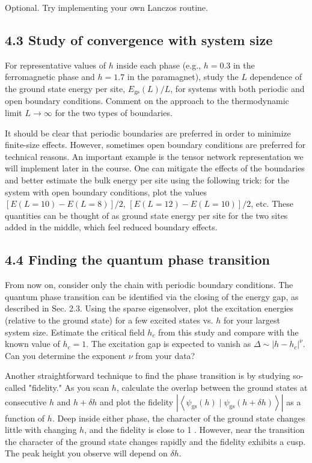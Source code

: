 \documentclass[12pt]{article}
\begin{document}
Optional. Try implementing your own Lanczos routine.

\subsection*{4.3 Study of convergence with system size}
For representative values of $h$ inside each phase (e.g., $h=0.3$ in the ferromagnetic phase and $h=1.7$ in the paramagnet), study the $L$ dependence of the ground state energy per site, $E_{\mathrm{gs}}(L) / L$, for systems with both periodic and open boundary conditions. Comment on the approach to the thermodynamic limit $L \rightarrow \infty$ for the two types of boundaries.

It should be clear that periodic boundaries are preferred in order to minimize finite-size effects. However, sometimes open boundary conditions are preferred for technical reasons. An important example is the tensor network representation we will implement later in the course. One can mitigate the effects of the boundaries and better estimate the bulk energy per site using the following trick: for the system with open boundary conditions, plot the values $[E(L=10)-E(L=8)] / 2$, $[E(L=12)-E(L=10)] / 2$, etc. These quantities can be thought of as ground state energy per site for the two sites added in the middle, which feel reduced boundary effects.

\subsection*{4.4 Finding the quantum phase transition}
From now on, consider only the chain with periodic boundary conditions. The quantum phase transition can be identified via the closing of the energy gap, as described in Sec. 2.3. Using the sparse eigensolver, plot the excitation energies (relative to the ground state) for a few excited states vs. $h$ for your largest system size. Estimate the critical field $h_{c}$ from this study and compare with the known value of $h_{c}=1$. The excitation gap is expected to vanish as $\Delta \sim\left|h-h_{c}\right|^{\nu}$. Can you determine the exponent $\nu$ from your data?

Another straightforward technique to find the phase transition is by studying so-called "fidelity." As you scan $h$, calculate the overlap between the ground states at consecutive $h$ and $h+\delta h$ and plot the fidelity $\left|\left\langle\psi_{\mathrm{gs}}(h) \mid \psi_{\mathrm{gs}}(h+\delta h)\right\rangle\right|$ as a function of $h$. Deep inside either phase, the character of the ground state changes little with changing $h$, and the fidelity is close to 1 . However, near the transition the character of the ground state changes rapidly and the fidelity exhibits a cusp. The peak height you observe will depend on $\delta h$.
\end{document}
